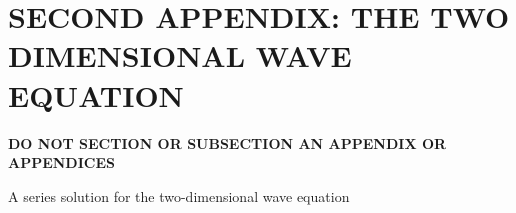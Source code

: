 \chapter{SECOND APPENDIX: THE TWO DIMENSIONAL WAVE EQUATION} \label{ap:2DWaveEquation}

{\bf  DO NOT SECTION OR SUBSECTION AN APPENDIX OR APPENDICES}

A series solution for the two-dimensional wave equation
